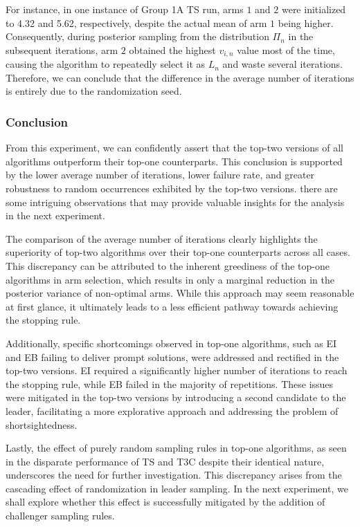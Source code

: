 \documentclass[a4paper, 12pt]{article}
\theoremstyle{definition}
\begin{document}
For instance, in one instance of Group 1A TS run, arms $1$ and $2$ were initialized to 4.32 and 5.62, respectively, despite the actual mean of arm $1$ being higher. Consequently, during posterior sampling from the distribution $\Pi_n$ in the subsequent iterations, arm $2$ obtained the highest $v_{i,n}$ value most of the time, causing the algorithm to repeatedly select it as $L_n$ and waste several iterations. Therefore, we can conclude that the difference in the average number of iterations is entirely due to the randomization seed.

\subsubsection{Conclusion}
From this experiment, we can confidently assert that the top-two versions of all algorithms outperform their top-one counterparts. This conclusion is supported by the lower average number of iterations, lower failure rate, and greater robustness to random occurrences exhibited by the top-two versions. there are some intriguing observations that may provide valuable insights for the analysis in the next experiment.

The comparison of the average number of iterations clearly highlights the superiority of top-two algorithms over their top-one counterparts across all cases. This discrepancy can be attributed to the inherent greediness of the top-one algorithms in arm selection, which results in only a marginal reduction in the posterior variance of non-optimal arms. While this approach may seem reasonable at first glance, it ultimately leads to a less efficient pathway towards achieving the stopping rule.

Additionally, specific shortcomings observed in top-one algorithms, such as EI and EB failing to deliver prompt solutions, were addressed and rectified in the top-two versions. EI required a significantly higher number of iterations to reach the stopping rule, while EB failed in the majority of repetitions. These issues were mitigated in the top-two versions by introducing a second candidate to the leader, facilitating a more explorative approach and addressing the problem of shortsightedness.

Lastly, the effect of purely random sampling rules in top-one algorithms, as seen in the disparate performance of TS and T3C despite their identical nature, underscores the need for further investigation. This discrepancy arises from the cascading effect of randomization in leader sampling. In the next experiment, we shall explore whether this effect is successfully mitigated by the addition of challenger sampling rules.
\end{document}

